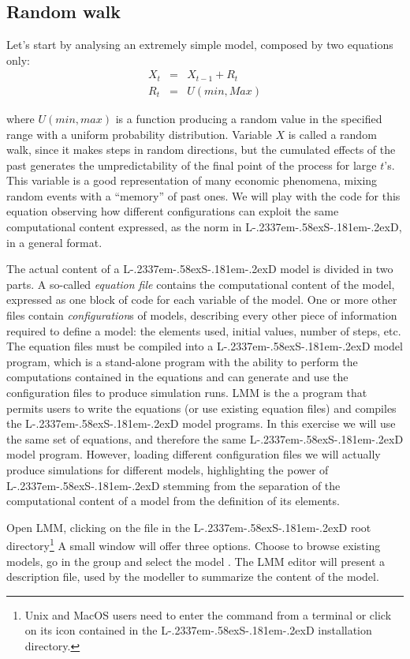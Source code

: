 \documentclass [11pt,a4paper] {book}
\def\LsD{{L\kern-.2337em\lower-.58ex\hbox{S}\kern-.181em\lower-.2ex\hbox{D}}\xspace}
\begin{document}
\subsection{Random walk}

Let's start by analysing an extremely simple model, composed by two equations only:
\begin{eqnarray*}
X_t & = & X_{t-1} + R_{t} \\
R_{t} & = & U(min, Max)
\end{eqnarray*}


where $U(min, max)$ is a function producing a random value in the specified range with a uniform  probability distribution. Variable $X$ is called a random walk, since it makes steps in random directions, but the cumulated effects of the past generates the umpredictability of the final point of the process for large $t$'s. This variable is a good representation of many economic phenomena, mixing random events with a ``memory'' of past ones. We will play with the code for this equation observing how different configurations can exploit the same computational content expressed, as the norm in \LsD, in a general format.

The actual content of a \LsD model is divided in two parts. A so-called \textit{equation file} contains the computational content of the model, expressed as one block of code for each variable of the model. One or more other files contain  \textit{configuration}s of models, describing every other piece of information required to define a model: the elements used, initial values, number of steps, etc. The equation files must be compiled into a \LsD model program, which is a stand-alone program with the ability to perform the computations contained in the equations and can generate and use the configuration files to produce simulation runs. LMM is the a program that permits users to write the equations (or use existing equation files) and compiles the \LsD model programs. In this exercise we will use the same set of equations, and therefore the same \LsD model program. However, loading different configuration files we will actually produce simulations for different models, highlighting the power of \LsD stemming from the separation of the computational content of a model from the definition of its elements.

Open LMM, clicking on the  file in the \LsD root directory\footnote{Unix and MacOS users need to enter the command  from a terminal or click on its icon contained in the \LsD installation directory.} A small window will offer three options. Choose to browse existing models, go in the group  and select the model . The LMM editor will present a description file, used by the modeller to summarize the content of the model. 
\end{document}
